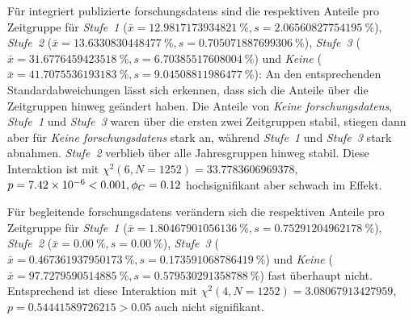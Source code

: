 Für integriert publizierte \glspl{forschungsdaten} sind die respektiven Anteile pro Zeitgruppe für \textit{Stufe~1} ($\bar{x}=\SI[round-mode=places,round-precision=2]{12.9817173934821}{\percent},s=\SI[round-mode=places,round-precision=2]{2.06560827754195}{\percent}$), \textit{Stufe~2} ($\bar{x}=\SI[round-mode=places,round-precision=2]{13.6330830448477}{\percent},s=\SI[round-mode=places,round-precision=2]{0.705071887699306}{\percent}$), \textit{Stufe~3} ($\bar{x}=\SI[round-mode=places,round-precision=2]{31.6776459423518}{\percent},s=\SI[round-mode=places,round-precision=2]{6.70385517608004}{\percent}$) und \textit{Keine} ($\bar{x}=\SI[round-mode=places,round-precision=2]{41.7075536193183}{\percent},s=\SI[round-mode=places,round-precision=2]{9.04508811986477}{\percent}$):
An den entsprechenden Standardabweichungen lässt sich erkennen, dass sich die Anteile über die Zeitgruppen hinweg geändert haben.
Die Anteile von \textit{Keine \glspl{forschungsdaten}}, \textit{Stufe~1} und \textit{Stufe~3} waren über die ersten zwei Zeitgruppen stabil, stiegen dann aber für \textit{Keine \glspl{forschungsdaten}} stark an, während \textit{Stufe~1} und \textit{Stufe~3} stark abnahmen.
\textit{Stufe~2} verblieb über alle Jahresgruppen hinweg stabil.
Diese Interaktion ist mit $\chi^2 (\num{6}, N = \num{1252}) = \num[round-mode=places,round-precision=2]{33.7783606969378}$, $p = \num[round-mode=places,round-precision=2]{7.42382998991651E-06}<\num{0.001},\phi_C=\num[round-mode=places,round-precision=2]{0.116145428931647}$ hochsignifikant aber schwach im Effekt.

Für begleitende \glspl{forschungsdaten} verändern sich die respektiven Anteile pro Zeitgruppe für \textit{Stufe~1} ($\bar{x}=\SI[round-mode=places,round-precision=2]{1.80467901056136}{\percent},s=\SI[round-mode=places,round-precision=2]{0.75291204962178}{\percent}$), \textit{Stufe~2} ($\bar{x}=\SI[round-mode=places,round-precision=2]{0,00}{\percent},s=\SI[round-mode=places,round-precision=2]{0.00}{\percent}$), \textit{Stufe~3} ($\bar{x}=\SI[round-mode=places,round-precision=2]{0.467361937950173}{\percent},s=\SI[round-mode=places,round-precision=2]{0.173591068786419}{\percent}$) und \textit{Keine} ($\bar{x}=\SI[round-mode=places,round-precision=2]{97.7279590514885}{\percent},s=\SI[round-mode=places,round-precision=2]{0.579530291358788}{\percent}$) fast überhaupt nicht.
Entsprechend ist diese Interaktion mit $\chi^2 (\num{4}, N = \num{1252}) = \num[round-mode=places,round-precision=2]{3.08067913427959}$, $p = \num[round-mode=places,round-precision=2]{0.54441589726215}>\num{0.05}$ auch nicht signifikant.

